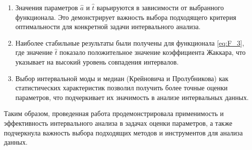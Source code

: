 \documentclass{article}
\begin{document}
  \begin{enumerate}
    \item Значения параметров \( \hat a \) и \( \hat t \) варьируются в
      зависимости от выбранного функционала. Это демонстрирует важность
      выбора подходящего критерия оптимальности для конкретной задачи
      интервального анализа.
    \item Наиболее стабильные результаты были получены для функционала
      \ref{eq:F_3}, где значение \( \hat t \) показало положительное
      значение коэффициента Жаккара, что указывает на высокий уровень
      совпадения интервалов.
    \item Выбор интервальной моды и медиан (Крейновича и Пролубникова) как
      статистических характеристик позволил получить более точные оценки
      параметров, что подчеркивает их значимость в анализе интервальных
      данных.
  \end{enumerate}

  Таким образом, проведенная работа продемонстрировала применимость и
  эффективность интервального анализа в задачах оценки параметров, а также
  подчеркнула важность выбора подходящих методов и инструментов для
  анализа данных.
\end{document}
